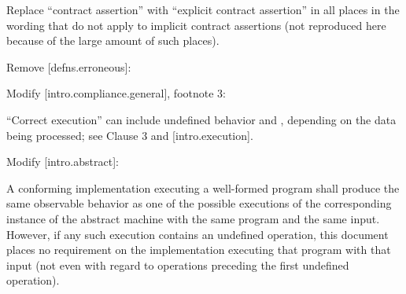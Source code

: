 
Replace ``contract assertion'' with ``explicit contract assertion'' in all places in the wording that do not apply to implicit contract assertions (not reproduced here because of the large amount of such places).

Remove [defns.erroneous]:

\begin{adjustwidth}{0.5cm}{0.5cm}


\end{adjustwidth}

Modify [intro.compliance.general], footnote 3:

\begin{adjustwidth}{0.5cm}{0.5cm}
“Correct execution” can include undefined behavior and , depending on the data being processed; see Clause 3 and [intro.execution].
\end{adjustwidth}

Modify [intro.abstract]:

\begin{adjustwidth}{0.5cm}{0.5cm}
A conforming implementation executing a well-formed program shall produce the same observable behavior as one of the possible executions of the corresponding instance of the abstract machine with the same program and the same input. However, if any such execution contains an undefined operation, this document places no requirement on the implementation executing that program with that input (not even with regard to operations preceding the first undefined operation). 


\end{adjustwidth}

